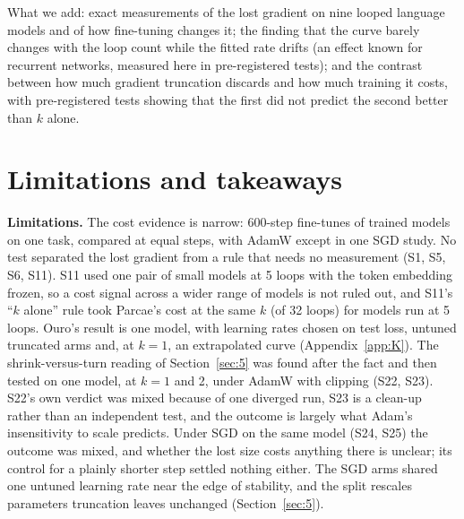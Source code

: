 \documentclass[10pt]{article}
\begin{document}
What we add: exact measurements of the lost gradient on nine looped language models and of how fine-tuning changes it; the finding that the curve barely changes with the loop count while the fitted rate drifts (an effect known for recurrent networks, measured here in pre-registered tests); and the contrast between how much gradient truncation discards and how much training it costs, with pre-registered tests showing that the first did not predict the second better than $k$ alone.

\section{Limitations and takeaways}\label{sec:8}

\textbf{Limitations.} The cost evidence is narrow: 600-step fine-tunes of trained models on one task, compared at equal steps, with AdamW except in one SGD study. No test separated the lost gradient from a rule that needs no measurement (S1, S5, S6, S11). S11 used one pair of small models at 5 loops with the token embedding frozen, so a cost signal across a wider range of models is not ruled out, and S11's ``$k$ alone'' rule took Parcae's cost at the same $k$ (of 32 loops) for models run at 5 loops. Ouro's result is one model, with learning rates chosen on test loss, untuned truncated arms and, at $k = 1$, an extrapolated curve (Appendix~\ref{app:K}). The shrink-versus-turn reading of Section~\ref{sec:5} was found after the fact and then tested on one model, at $k = 1$ and 2, under AdamW with clipping (S22, S23). S22's own verdict was mixed because of one diverged run, S23 is a clean-up rather than an independent test, and the outcome is largely what Adam's insensitivity to scale predicts. Under SGD on the same model (S24, S25) the outcome was mixed, and whether the lost size costs anything there is unclear; its control for a plainly shorter step settled nothing either. The SGD arms shared one untuned learning rate near the edge of stability, and the split rescales parameters truncation leaves unchanged (Section~\ref{sec:5}).
\end{document}
